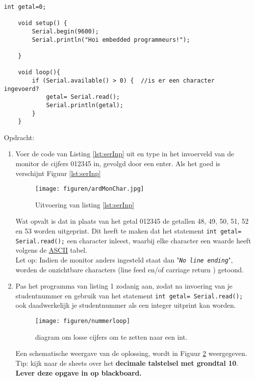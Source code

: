 \begin{lstlisting}[numbers=none ,caption= inlezen via de seriele poort.,label={lst:serInp}]	
	int getal=0;
	
	void setup() {  
		Serial.begin(9600);
		Serial.println("Hoi embedded programmeurs!");
		
	}
	
	void loop(){
		if (Serial.available() > 0) {  //is er een character ingevoerd?
			getal= Serial.read();
			Serial.println(getal);
		}
	}
\end{lstlisting} 
Opdracht:

\begin{enumerate}
	\item Voer de code van Listing \ref{lst:serInp} uit en type in het invoerveld van de monitor de cijfers 012345 in, gevolgd door een enter.
	Als het goed is verschijnt Figuur \ref{lst:serInp}
	
	\begin{figure}[h!]
		\captionsetup{justification=centering}
		\texttt{[image: figuren/ardMonChar.jpg]}
		\centering
		\caption{Uitvoering van listing \ref{lst:serInp}}
		\label{fig:ardMonChr}
	\end{figure}
	Wat opvalt is dat in plaats van het getal 012345 de getallen 48, 49, 50, 51, 52 en 53 worden uitgeprint. Dit heeft te maken dat het statement 
	\texttt{int getal=\textcolor{BurntOrange}{ Serial.read}();} een character inleest, waarbij elke character een waarde heeft volgens de \href{https://nl.wikipedia.org/wiki/ASCII_(tekenset)}{ASCII} tabel.\\
	Let op: Indien de monitor anders ingesteld staat dan "\texttt{\textit{No line ending}}", worden de onzichtbare characters (line feed en/of carriage return ) getoond. 
	\item Pas het programma van listing 1 zodanig aan, zodat na invoering van je studentnummer en gebruik van het statement \texttt{int getal=\textcolor{BurntOrange}{ Serial.read}();} ook daadwerkelijk je studentnummer als een integer uitprint kan worden. 
	\begin{figure}[h!]
		\captionsetup{justification=centering}
		\texttt{[image: figuren/nummerloop]}
		\centering
		\caption{diagram om  losse cijfers om te zetten naar een int. }
		\label{fig:progFig}
	\end{figure}
	Een schematische weergave van de oplossing, wordt in Figuur \ref{fig:progFig} weergegeven.
	\small{Tip: kijk naar de sheets over het \textbf{decimale talstelsel met grondtal 10}}.\\
	\textbf{Lever deze opgave in op blackboard.}
\end{enumerate}

